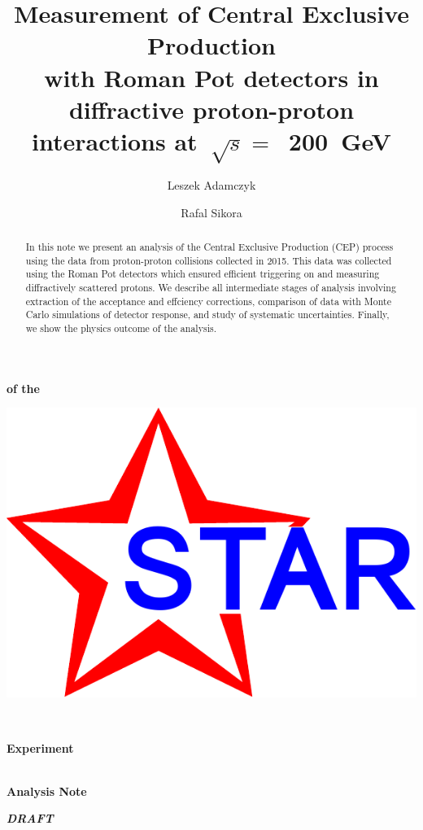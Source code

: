 \documentclass[a4paper,10pt,notitlepage]{report}
\title{\textbf{Measurement of Central Exclusive Production\\with Roman Pot detectors in diffractive proton-proton interactions at~$\sqrt{s}=$~200~GeV}\vspace*{10pt}}
\author[1]{Leszek Adamczyk}
\author[1]{Rafal Sikora}
\affil[1]{AGH University of Science and Technology, Krakow, Poland}
\begin{document}
\begin{center}
\begin{minipage}[c]{0.12\linewidth}%
\vspace{5.5pt}\textbf{\LARGE{of the}}
\end{minipage}
\begin{minipage}[c]{0.15\linewidth}%
\hspace*{-8pt}\includegraphics[width=\linewidth]{graphics/STAR_logo.pdf}
\end{minipage}~
\begin{minipage}[c]{0.24\linewidth}%
\vspace{9pt}\hspace*{-8pt}\textbf{\LARGE{Experiment}}
\end{minipage}\\[-50pt]
\textbf{\LARGE{Analysis Note}}

\vspace*{150pt}
\begin{minipage}{\linewidth}
\maketitle
\begin{abstract}
In this note we present an analysis of the Central Exclusive Production (CEP) process using the data from proton-proton collisions collected in 2015. This data was collected using the Roman Pot detectors which ensured efficient triggering on and measuring diffractively scattered protons. We describe all intermediate stages of analysis involving extraction of the acceptance and effciency corrections, comparison of data with Monte Carlo simulations of detector response, and study of systematic uncertainties. Finally, we show the physics outcome of the analysis.
\end{abstract}
\thispagestyle{empty}
\end{minipage}

\vspace{100pt}

 \Huge{\textbf{\textit{DRAFT}}}
\end{center}
\end{document}
